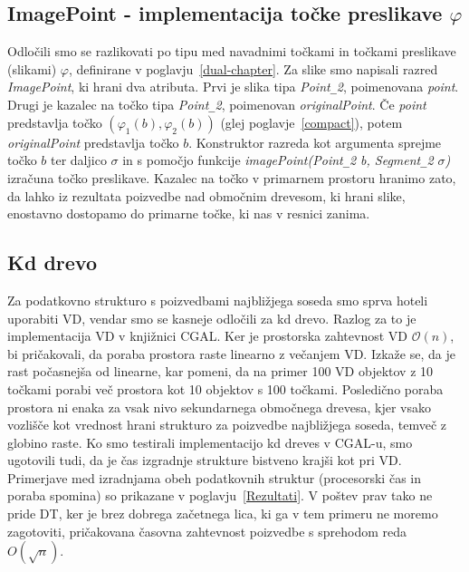 \documentclass[a4paper, 12pt]{book}
\newcommand{\OO}{\ensuremath{\mathcal{O}}} %
\newcommand{\U}{\texttt{\_}}
\begin{document}
\subsection{ImagePoint - implementacija točke preslikave $\varphi$}
Odločili smo se razlikovati po tipu med navadnimi točkami in točkami preslikave (slikami) $\varphi$, definirane v poglavju~\ref{dual-chapter}. Za slike smo napisali razred \textit{ImagePoint}, ki hrani dva atributa. Prvi je slika tipa \textit{Point\texttt{\_}2}, poimenovana \textit{point}. Drugi je kazalec na točko tipa \textit{Point\texttt{\_}2}, poimenovan \textit{originalPoint}. Če \textit{point} predstavlja točko $(\varphi_1(b), \varphi_2(b))$ (glej poglavje~\ref{compact}), potem \textit{originalPoint} predstavlja točko $b$. Konstruktor razreda kot argumenta sprejme točko $b$ ter daljico $\sigma$ in s pomočjo funkcije \textit{imagePoint(Point\U 2 b, Segment\U 2 $\sigma$)} izračuna točko preslikave. Kazalec na točko v primarnem prostoru hranimo zato, da lahko iz rezultata poizvedbe nad območnim drevesom, ki hrani slike, enostavno dostopamo do primarne točke, ki nas v resnici zanima.

\subsection{Kd drevo}
Za podatkovno strukturo s poizvedbami najbližjega soseda smo sprva hoteli uporabiti VD, vendar smo se kasneje odločili za kd drevo. Razlog za to je implementacija VD v knjižnici CGAL. Ker je prostorska zahtevnost VD $\OO(n)$, bi pričakovali, da poraba prostora raste linearno z večanjem VD. Izkaže se, da je rast počasnejša od linearne, kar pomeni, da na primer 100 VD objektov z 10 točkami porabi več prostora kot 10 objektov s 100 točkami. Posledično poraba prostora ni enaka za vsak nivo sekundarnega območnega drevesa, kjer vsako vozlišče kot vrednost hrani strukturo za poizvedbe najbližjega soseda, temveč z globino raste. Ko smo testirali implementacijo kd dreves v CGAL-u, smo ugotovili tudi, da je čas izgradnje strukture bistveno krajši kot pri VD. Primerjave med izradnjama obeh podatkovnih struktur (procesorski čas in poraba spomina) so prikazane v poglavju~\ref{Rezultati}. V poštev prav tako ne pride DT, ker je brez dobrega začetnega lica, ki ga v tem primeru ne moremo zagotoviti, pričakovana časovna zahtevnost poizvedbe s sprehodom reda $O(\sqrt{n})$.
\end{document}
